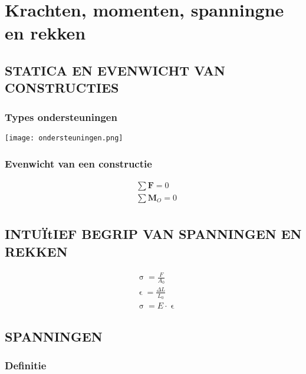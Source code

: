 \chapter{Krachten, momenten, spanningne en rekken}

    \section{STATICA EN EVENWICHT VAN CONSTRUCTIES}

        \subsection{Types ondersteuningen}

            \begin{center}
                \texttt{[image: ondersteuningen.png]}
            \end{center}

        \subsection{Evenwicht van een constructie}

            \begin{align*}
                &\sum\mathbf{F} = 0\\
                &\sum\mathbf{M}_O = 0\\
            \end{align*}
    
    \section{INTUÏtIEF BEGRIP VAN SPANNINGEN EN REKKEN}

        \begin{align*}
            &\upsigma = \frac{F}{A_0}\\
            &\upvarepsilon = \frac{\Delta L}{L_0}\\
            &\upsigma = E\cdot \upvarepsilon
        \end{align*}

    \section{SPANNINGEN}
        
        \subsection{Definitie}

